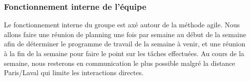\subsubsection{Fonctionnement interne de l'équipe}
Le fonctionnement interne du groupe est axé autour de la méthode agile.
Nous allons faire une réunion de planning une fois par semaine au début de la semaine afin de déterminer le programme de travail de la semaine à venir, et une réunion à la fin de la semaine pour faire le point sur les tâches effectuées.
Au cours de la semaine, nous resterons en communication le plus possible malgré la distance Paris/Laval qui limite les interactions directes.


